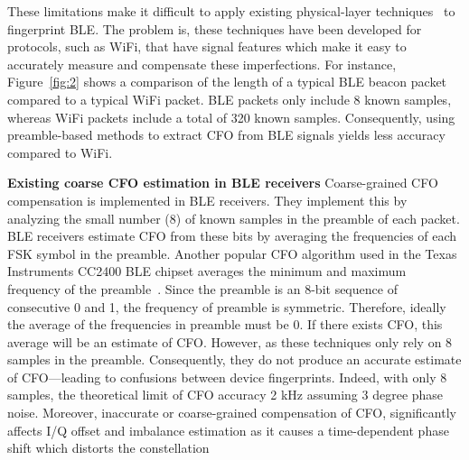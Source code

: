 
%  
These limitations make it difficult to apply existing physical-layer techniques~\cite{vohuuusrp,Brik_radiometric,deviceID_kose,Intrusion_hall,suskitransient,deeplearning_merchant,lora_robyns,gopalakrishnan2019robust}
to fingerprint BLE.
%
The problem is, these techniques have been developed for protocols, such as
WiFi, that have signal features which make it easy to accurately measure and compensate these imperfections.
%
For instance, Figure~\ref{fig:2} shows a comparison of the length of a typical
BLE beacon packet compared to a typical WiFi packet.
%
BLE packets only include 8 known samples, whereas WiFi packets include 
a total of 320 known samples. Consequently, using preamble-based methods to extract CFO from BLE signals yields less accuracy compared to WiFi.


\vspace{0.5em}
\noindent\textbf{Existing coarse CFO estimation in BLE receivers}
Coarse-grained CFO compensation is implemented in BLE receivers.  They
implement this by analyzing the small number (8) of known samples in the
preamble of each packet.
%
BLE receivers estimate CFO from these bits by averaging the frequencies of each
FSK symbol in the preamble. Another popular CFO algorithm used in the Texas
Instruments CC2400 BLE chipset averages the minimum and maximum frequency of
the preamble~\cite{cvtracksun}.
%
Since the preamble is an 8-bit sequence of consecutive 0 and 1, the frequency
of preamble is symmetric.  Therefore, ideally the average of the frequencies in
preamble must be 0. If there exists CFO, this average will be an estimate of
CFO.
%
However, as these techniques only rely on 8 samples in the preamble. Consequently, they do not produce an
accurate estimate of CFO---leading to confusions between device fingerprints.
%
Indeed, with only 8 samples, the theoretical limit of CFO accuracy 2 kHz assuming 3 degree phase noise. Moreover, inaccurate or coarse-grained compensation of CFO, significantly affects I/Q offset and imbalance estimation as it causes a time-dependent phase
shift which distorts the \iq constellation


